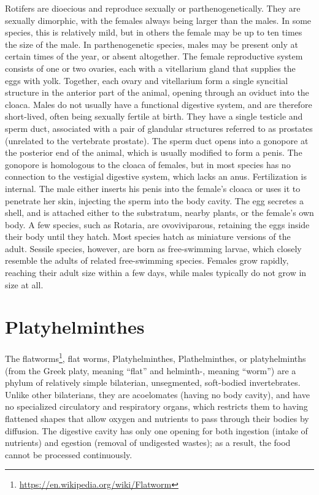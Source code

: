\documentclass[]{book}
\let\rmarkdownfootnote\footnote%
\def\footnote{\protect\rmarkdownfootnote}
\renewcommand{\href}[2]{#2\footnote{\url{#1}}}
\theoremstyle{definition}
\theoremstyle{definition}
\theoremstyle{definition}
\theoremstyle{remark}
\begin{document}
Rotifers are dioecious and reproduce sexually or parthenogenetically.
They are sexually dimorphic, with the females always being larger than
the males. In some species, this is relatively mild, but in others the
female may be up to ten times the size of the male. In parthenogenetic
species, males may be present only at certain times of the year, or
absent altogether. The female reproductive system consists of one or two
ovaries, each with a vitellarium gland that supplies the eggs with yolk.
Together, each ovary and vitellarium form a single syncitial structure
in the anterior part of the animal, opening through an oviduct into the
cloaca. Males do not usually have a functional digestive system, and are
therefore short-lived, often being sexually fertile at birth. They have
a single testicle and sperm duct, associated with a pair of glandular
structures referred to as prostates (unrelated to the vertebrate
prostate). The sperm duct opens into a gonopore at the posterior end of
the animal, which is usually modified to form a penis. The gonopore is
homologous to the cloaca of females, but in most species has no
connection to the vestigial digestive system, which lacks an anus.
Fertilization is internal. The male either inserts his penis into the
female's cloaca or uses it to penetrate her skin, injecting the sperm
into the body cavity. The egg secretes a shell, and is attached either
to the substratum, nearby plants, or the female's own body. A few
species, such as Rotaria, are ovoviviparous, retaining the eggs inside
their body until they hatch. Most species hatch as miniature versions of
the adult. Sessile species, however, are born as free-swimming larvae,
which closely resemble the adults of related free-swimming species.
Females grow rapidly, reaching their adult size within a few days, while
males typically do not grow in size at all.

\section{Platyhelminthes}\label{platyhelminthes}

The \href{https://en.wikipedia.org/wiki/Flatworm}{flatworms}, flat
worms, Platyhelminthes, Plathelminthes, or platyhelminths (from the
Greek platy, meaning ``flat'' and helminth-, meaning ``worm'') are a
phylum of relatively simple bilaterian, unsegmented, soft-bodied
invertebrates. Unlike other bilaterians, they are acoelomates (having no
body cavity), and have no specialized circulatory and respiratory
organs, which restricts them to having flattened shapes that allow
oxygen and nutrients to pass through their bodies by diffusion. The
digestive cavity has only one opening for both ingestion (intake of
nutrients) and egestion (removal of undigested wastes); as a result, the
food cannot be processed continuously.
\end{document}
